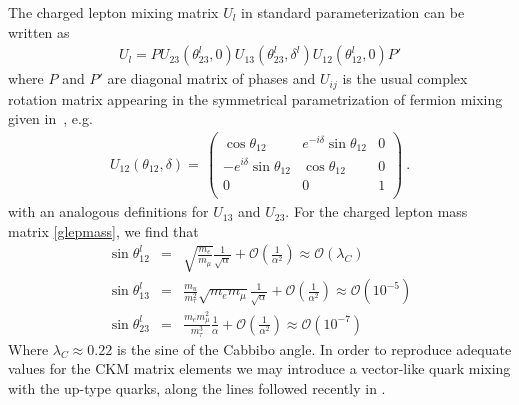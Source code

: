 \documentclass[english,10pt,aps,prd,a4paper,preprintnumbers,floatfix,nofootinbib,showpacs,superscriptaddress]{revtex4-1}
\begin{document}
The charged lepton mixing matrix $U_l$ in standard
parameterization can be written as
%
\begin{eqnarray}
 U_l = P U_{23} (\theta^l_{23}, 0) U_{13} (\theta^l_{23}, \delta^l) U_{12} (\theta^l_{12}, 0) P'
\end{eqnarray}
%
where $P$ and $P'$ are diagonal matrix of phases and $U_{ij}$ is the
usual complex rotation matrix appearing in the symmetrical
parametrization of fermion mixing given in~\cite{Schechter:1980gr}, e.g.
%
\begin{eqnarray}
  U_{12} (\theta_{12}, \delta) =  \, \left( 
\begin{array}{ccc}
\cos \theta_{12}      & e^{-i\delta} \sin \theta_{12}            &  0           \\
-e^{i\delta}\sin \theta_{12}     & \cos \theta_{12} &  0   \\
0     & 0    &  1     \\  
\end{array}
\right)~.
   \label{magmat}
  \end{eqnarray}
%
  with an analogous definitions for $U_{13}$ and $U_{23}$.  For the
  charged lepton mass matrix \ref{glepmass}, we find that
%
\begin{eqnarray}
\sin \theta^l_{12} & = & \sqrt{\frac{m_e}{m_\mu}} \frac{1}{\sqrt{\alpha}}+ \mathcal{O}(\frac{1}{\alpha^2}) \approx \mathcal{O} (\lambda_C) \nonumber \\
\sin \theta^l_{13} & = & \frac{m_u}{m_\tau^2} \sqrt{m_e m_\mu} \frac{1}{\sqrt{\alpha}} + \mathcal{O}(\frac{1}{\alpha^2}) \approx \mathcal{O} (10^{-5}) \nonumber \\
\sin \theta^l_{23} & = & \frac{m_e m_\mu^2}{m^3_\tau} \frac{1}{\alpha} + \mathcal{O}(\frac{1}{\alpha^2}) \approx \mathcal{O} (10^{-7})
 \label{leprot}
\end{eqnarray}
%
Where $\lambda_C \approx 0.22$ is the sine of the Cabbibo angle. In order to reproduce
adequate values for the CKM matrix elements we may introduce a
vector-like quark mixing with the up-type quarks, along the lines
followed recently in \cite{Bonilla:2016sgx}.
\end{document}
